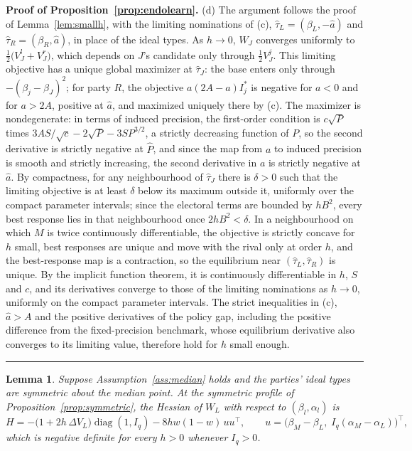 \documentclass[12pt,letterpaper]{article}
\newtheorem{lemma}{Lemma}
\newenvironment{proof}[1][Proof]{\noindent\textbf{#1.} }{\ \rule{0.5em}{0.5em}}
\begin{document}
\begin{proof}[Proof of Proposition~\ref{prop:endolearn}]
(d) The argument follows the proof of Lemma~\ref{lem:smallh}, with the limiting nominations of (c), $\widehat\tau_L=(\beta_L,-\widehat a)$ and $\widehat\tau_R=(\beta_R,\widehat a)$, in place of the ideal types. As $h\to0$, $W_J$ converges uniformly to $\tfrac12\big(V_J^l+V_J^r\big)$, which depends on $J$'s candidate only through $\tfrac12V_J^j$. This limiting objective has a unique global maximizer at $\widehat\tau_J$: the base enters only through $-(\beta_j-\beta_J)^2$; for party $R$, the objective $a(2A-a)I_j^*$ is negative for $a<0$ and for $a>2A$, positive at $\widehat a$, and maximized uniquely there by (c). The maximizer is nondegenerate: in terms of induced precision, the first-order condition is $c\sqrt P$ times $3AS/\sqrt c-2\sqrt P-3SP^{3/2}$, a strictly decreasing function of $P$, so the second derivative is strictly negative at $\widehat P$, and since the map from $a$ to induced precision is smooth and strictly increasing, the second derivative in $a$ is strictly negative at $\widehat a$. By compactness, for any neighbourhood of $\widehat\tau_J$ there is $\delta>0$ such that the limiting objective is at least $\delta$ below its maximum outside it, uniformly over the compact parameter intervals; since the electoral terms are bounded by $hB^2$, every best response lies in that neighbourhood once $2hB^2<\delta$. In a neighbourhood on which $M$ is twice continuously differentiable, the objective is strictly concave for $h$ small, best responses are unique and move with the rival only at order $h$, and the best-response map is a contraction, so the equilibrium near $(\widehat\tau_L,\widehat\tau_R)$ is unique. By the implicit function theorem, it is continuously differentiable in $h$, $S$ and $c$, and its derivatives converge to those of the limiting nominations as $h\to0$, uniformly on the compact parameter intervals. The strict inequalities in (c), $\widehat a>A$ and the positive derivatives of the policy gap, including the positive difference from the fixed-precision benchmark, whose equilibrium derivative also converges to its limiting value, therefore hold for $h$ small enough.
\end{proof}

\begin{lemma}\label{lem:soc}
Suppose Assumption~\ref{ass:median} holds and the parties' ideal types are symmetric about the median point. At the symmetric profile of Proposition~\ref{prop:symmetric}, the Hessian of $W_L$ with respect to $(\beta_l,\alpha_l)$ is
\begin{equation}\label{eq:hessian}
H=-\big(1+2h\,\Delta V_L\big)\operatorname{diag}(1,I_q)-8hw(1-w)\,uu^{\top},
\qquad u=\big(\beta_M-\beta_L,\;I_q(\alpha_M-\alpha_L)\big)^{\top},
\end{equation}
which is negative definite for every $h>0$ whenever $I_q>0$.
\end{lemma}
\end{document}
